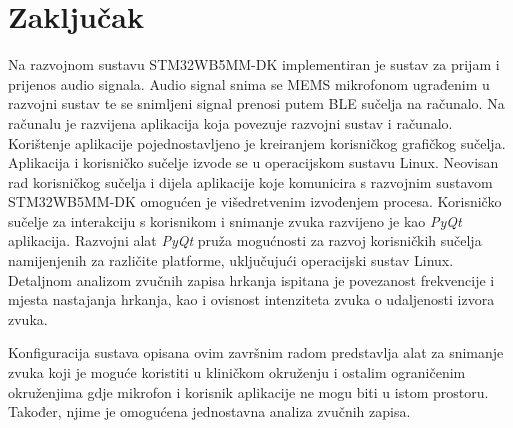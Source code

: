 \chapter{Zaključak}

Na razvojnom sustavu STM32WB5MM-DK implementiran je sustav za prijam i prijenos audio signala. Audio signal snima se MEMS mikrofonom ugrađenim u razvojni sustav te se snimljeni signal prenosi putem BLE sučelja na računalo. Na računalu je razvijena aplikacija koja povezuje razvojni sustav i računalo. Korištenje aplikacije pojednostavljeno je kreiranjem korisničkog grafičkog sučelja. Aplikacija i korisničko sučelje izvode se u operacijskom sustavu Linux. Neovisan rad korisničkog sučelja i dijela aplikacije koje komunicira s razvojnim sustavom STM32WB5MM-DK omogućen je višedretvenim izvođenjem procesa. Korisničko sučelje za interakciju s korisnikom i snimanje zvuka razvijeno je kao \textit{PyQt} aplikacija. Razvojni alat \textit{PyQt} pruža mogućnosti za razvoj korisničkih sučelja namijenjenih za različite platforme, uključujući operacijski sustav Linux. Detaljnom analizom zvučnih zapisa hrkanja ispitana je povezanost frekvencije i mjesta nastajanja hrkanja, kao i ovisnost intenziteta zvuka o udaljenosti izvora zvuka. 

Konfiguracija sustava opisana ovim završnim radom predstavlja alat za snimanje zvuka koji je moguće koristiti u kliničkom okruženju i ostalim ograničenim okruženjima gdje mikrofon i korisnik aplikacije ne mogu biti u istom prostoru. Također, njime je omogućena jednostavna analiza zvučnih zapisa. 

\eject